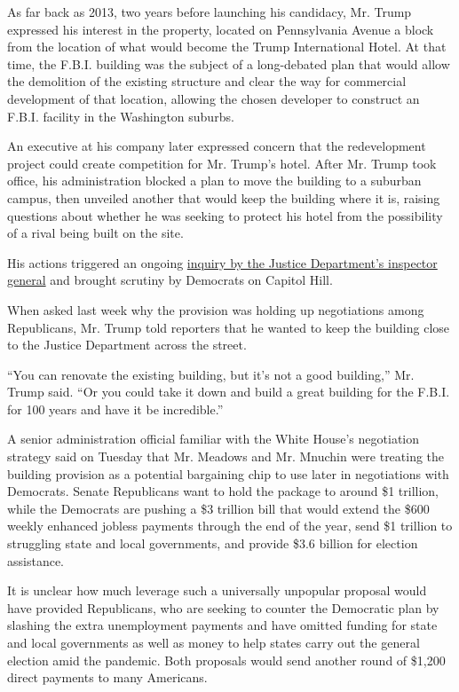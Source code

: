 As far back as 2013, two years before launching his candidacy, Mr. Trump
expressed his interest in the property, located on Pennsylvania Avenue a
block from the location of what would become the Trump International
Hotel. At that time, the F.B.I. building was the subject of a
long-debated plan that would allow the demolition of the existing
structure and clear the way for commercial development of that location,
allowing the chosen developer to construct an F.B.I. facility in the
Washington suburbs.

An executive at his company later expressed concern that the
redevelopment project could create competition for Mr. Trump's hotel.
After Mr. Trump took office, his administration blocked a plan to move
the building to a suburban campus, then unveiled another that would keep
the building where it is, raising questions about whether he was seeking
to protect his hotel from the possibility of a rival being built on the
site.

His actions triggered an ongoing
\href{https://www.nytimes3xbfgragh.onion/2019/07/03/us/politics/fbi-headquarters-inspector-general-investigation.html}{inquiry
by the Justice Department's inspector general} and brought scrutiny by
Democrats on Capitol Hill.

When asked last week why the provision was holding up negotiations among
Republicans, Mr. Trump told reporters that he wanted to keep the
building close to the Justice Department across the street.

``You can renovate the existing building, but it's not a good
building,'' Mr. Trump said. ``Or you could take it down and build a
great building for the F.B.I. for 100 years and have it be incredible.''

A senior administration official familiar with the White House's
negotiation strategy said on Tuesday that Mr. Meadows and Mr. Mnuchin
were treating the building provision as a potential bargaining chip to
use later in negotiations with Democrats. Senate Republicans want to
hold the package to around \$1 trillion, while the Democrats are pushing
a \$3 trillion bill that would extend the \$600 weekly enhanced jobless
payments through the end of the year, send \$1 trillion to struggling
state and local governments, and provide \$3.6 billion for election
assistance.

It is unclear how much leverage such a universally unpopular proposal
would have provided Republicans, who are seeking to counter the
Democratic plan by slashing the extra unemployment payments and have
omitted funding for state and local governments as well as money to help
states carry out the general election amid the pandemic. Both proposals
would send another round of \$1,200 direct payments to many Americans.

